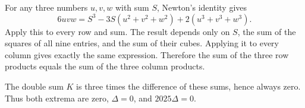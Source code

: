 For any three numbers $u,v,w$ with sum $S$, Newton's identity gives
\[
6uvw=S^3-3S(u^2+v^2+w^2)+2(u^3+v^3+w^3).
\]
Apply this to every row and sum. The result depends only on $S$, the sum of the squares of all nine entries, and the sum of their cubes. Applying it to every column gives exactly the same expression. Therefore the sum of the three row products equals the sum of the three column products.

The double sum $K$ is three times the difference of these sums, hence always zero. Thus both extrema are zero, $\Delta=0$, and $\boxed{2025\Delta=0}$.

